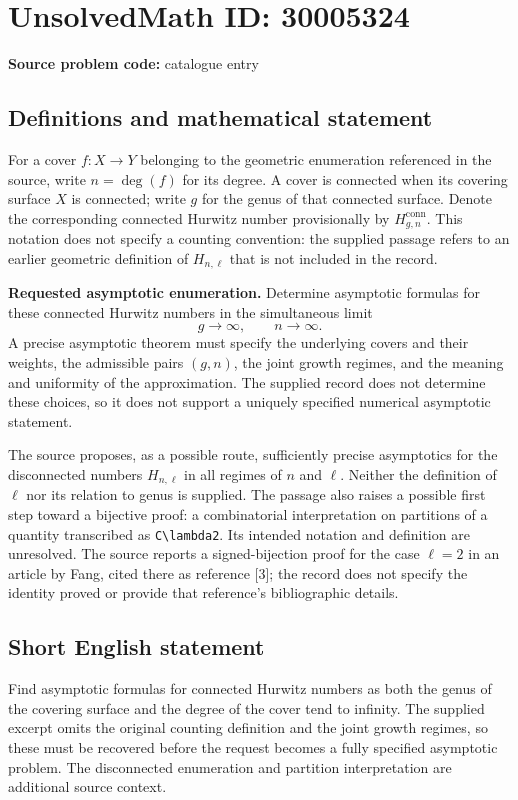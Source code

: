 \documentclass[11pt]{article}
\begin{document}
\section*{UnsolvedMath ID: 30005324}
\textbf{Source problem code:} catalogue entry
\subsection{Definitions and mathematical statement}
For a cover \(f\colon X\to Y\) belonging to the geometric enumeration referenced in the source, write \(n=\deg(f)\) for its degree. A cover is connected when its covering surface \(X\) is connected; write \(g\) for the genus of that connected surface. Denote the corresponding connected Hurwitz number provisionally by \(H^{\mathrm{conn}}_{g,n}\). This notation does not specify a counting convention: the supplied passage refers to an earlier geometric definition of \(H_{n,\ell}\) that is not included in the record.

\textbf{Requested asymptotic enumeration.} Determine asymptotic formulas for these connected Hurwitz numbers in the simultaneous limit
\[
 g\longrightarrow\infty,
 \qquad n\longrightarrow\infty.
\]
A precise asymptotic theorem must specify the underlying covers and their weights, the admissible pairs \((g,n)\), the joint growth regimes, and the meaning and uniformity of the approximation. The supplied record does not determine these choices, so it does not support a uniquely specified numerical asymptotic statement.

The source proposes, as a possible route, sufficiently precise asymptotics for the disconnected numbers \(H_{n,\ell}\) in all regimes of \(n\) and \(\ell\). Neither the definition of \(\ell\) nor its relation to genus is supplied. The passage also raises a possible first step toward a bijective proof: a combinatorial interpretation on partitions of a quantity transcribed as \texttt{C\textbackslash lambda2}. Its intended notation and definition are unresolved. The source reports a signed-bijection proof for the case \(\ell=2\) in an article by Fang, cited there as reference [3]; the record does not specify the identity proved or provide that reference's bibliographic details.
\subsection{Short English statement}
Find asymptotic formulas for connected Hurwitz numbers as both the genus of the covering surface and the degree of the cover tend to infinity. The supplied excerpt omits the original counting definition and the joint growth regimes, so these must be recovered before the request becomes a fully specified asymptotic problem. The disconnected enumeration and partition interpretation are additional source context.
\end{document}
